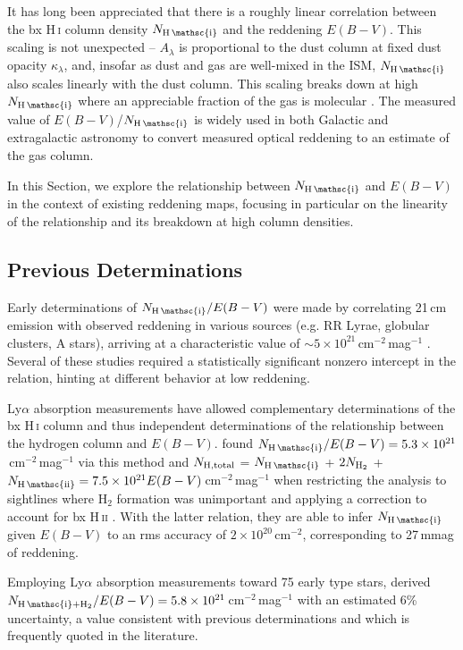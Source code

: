 \documentclass[iop,apj]{emulateapj}
\makeatletter
\def\testbx{bx}%
\DeclareRobustCommand{\ion}[2]{%
\relax\ifmmode
\ifx\testbx\f@series
{\mathbf{#1\,\mathsc{#2}}}\else
{\mathrm{#1\,\mathsc{#2}}}\fi
\else\textup{#1\,{\mdseries\textsc{#2}}}%
\fi}
\makeatother
\begin{document}
It has long been appreciated that there is a roughly linear correlation between the \ion{H}{i} column density $N_\ion{H}{i}$ and the reddening $E(B-V)$. This scaling is not unexpected -- $A_\lambda$ is proportional to the dust column at fixed dust opacity $\kappa_\lambda$, and, insofar as dust and gas are well-mixed in the ISM, $N_\ion{H}{i}$ also scales linearly with the dust column. This scaling breaks down at high $N_\ion{H}{i}$ where an appreciable fraction of the gas is molecular \citep{Wolfire+etal_2010}. The measured value of $E(B-V)$/$N_\ion{H}{i}$ is widely used in both Galactic and extragalactic astronomy to convert measured optical reddening to an estimate of the gas column.

In this Section, we explore the relationship between $N_\ion{H}{i}$ and $E(B-V)$ in the context of existing reddening maps, focusing in particular on the linearity of the relationship and its breakdown at high column densities.

\subsection{Previous Determinations}
Early determinations of $N_\ion{H}{i}/E(B-V)$ were made by correlating 21\,cm emission with observed reddening in various sources (e.g. RR Lyrae, globular clusters, A stars), arriving at a characteristic value of $\sim5\times10^{21}$\,cm$^{-2}$\,mag$^{-1}$ \citep{Sturch_1969,Knapp+Kerr+1974,Mirabel+Gergely_1979,Heiles_1976}. Several of these studies required a statistically significant nonzero intercept in the relation, hinting at different behavior at low reddening. 

Ly$\alpha$ absorption measurements have allowed complementary determinations of the \ion{H}{i} column and thus independent determinations of the relationship between the hydrogen column and $E(B-V)$. \citet{Jenkins+Savage_1974} found $N_\ion{H}{i}/E(B-V) = 5.3\times10^{21}$\,cm$^{-2}$\,mag$^{-1}$ via this method and $N_{\rm H, total}$ = $N_{\ion{H}{i}}$ + $2N_{{\rm H}_2}$ + $N_\ion{H}{ii} = 7.5\times10^{21}E(B-V)$\,cm$^{-2}$\,mag$^{-1}$ when restricting the analysis to sightlines where H$_2$ formation was unimportant and applying a correction to account for \ion{H}{ii}. With the latter relation, they are able to infer $N_\ion{H}{i}$ given $E(B-V)$ to an rms accuracy of $2\times10^{20}$\,cm$^{-2}$, corresponding to 27\,mmag of reddening.

Employing Ly$\alpha$ absorption measurements toward 75 early type stars, \citet{Bohlin+Savage+Drake_1978} derived $N_{\ion{H}{i}+{\rm H}_2}/E(B-V) = 5.8\times10^{21}$\,cm$^{-2}$\,mag$^{-1}$ with an estimated 6\% uncertainty, a value consistent with previous determinations and which is frequently quoted in the literature.
\end{document}
